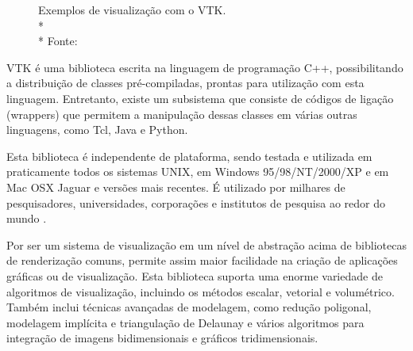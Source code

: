 \begin{figure}[ht]
 \begin{center}
 \end{center}
 \caption[Exemplos de visualização com o VTK.]{Exemplos de visualização com o VTK.\\* \\* Fonte: \citealt{vtk-page}}
 \label{fig:vtk-ex}
\end{figure}

VTK é uma biblioteca escrita na linguagem de programação C++, possibilitando a distribuição de classes pré-compiladas, prontas para utilização com esta linguagem. Entretanto, existe um subsistema que consiste de códigos de ligação (wrappers) que permitem a manipulação dessas classes em várias outras linguagens, como Tcl, Java e Python.

Esta biblioteca é independente de plataforma, sendo testada e utilizada em praticamente todos os sistemas UNIX, em Windows 95/98/NT/2000/XP e em Mac OSX Jaguar e versões mais recentes. É utilizado por milhares de pesquisadores, universidades, corporações e institutos de pesquisa ao redor do mundo \cite{vtk-page}.

Por ser um sistema de visualização em um nível de abstração acima de bibliotecas de renderização comuns, permite assim maior facilidade na criação de aplicações gráficas ou de visualização. Esta biblioteca suporta uma enorme variedade de algoritmos de visualização, incluindo os métodos escalar, vetorial e volumétrico. Também inclui técnicas avançadas de modelagem, como redução poligonal, modelagem implícita e triangulação de Delaunay e vários algoritmos para integração de imagens bidimensionais e gráficos tridimensionais.

